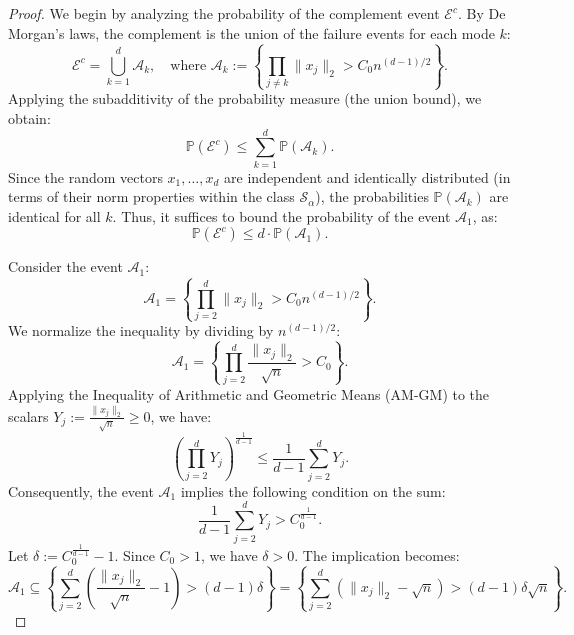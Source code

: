 \documentclass[10pt,a4paper]{amsart}
\begin{document}
\begin{proof}
We begin by analyzing the probability of the complement event $\mathcal{E}^c$. By De Morgan's laws, the complement is the union of the failure events for each mode $k$:
\begin{equation}
\mathcal{E}^c = \bigcup_{k=1}^d \mathcal{A}_k, \quad \text{where } \mathcal{A}_k := \left\{ \prod_{j \neq k} \|x_j\|_2 > C_0 n^{(d-1)/2} \right\}.
\end{equation}
Applying the subadditivity of the probability measure (the union bound), we obtain:
\begin{equation}
\mathbb{P}(\mathcal{E}^c) \le \sum_{k=1}^d \mathbb{P}(\mathcal{A}_k).
\end{equation}
Since the random vectors $x_1, \dots, x_d$ are independent and identically distributed (in terms of their norm properties within the class $\mathcal{S}_{\alpha}$), the probabilities $\mathbb{P}(\mathcal{A}_k)$ are identical for all $k$. Thus, it suffices to bound the probability of the event $\mathcal{A}_1$, as:
\begin{equation}
\mathbb{P}(\mathcal{E}^c) \le d \cdot \mathbb{P}(\mathcal{A}_1).
\end{equation}

Consider the event $\mathcal{A}_1$:
\begin{equation}
\mathcal{A}_1 = \left\{ \prod_{j=2}^d \|x_j\|_2 > C_0 n^{(d-1)/2} \right\}.
\end{equation}
We normalize the inequality by dividing by $n^{(d-1)/2}$:
\begin{equation}
\mathcal{A}_1 = \left\{ \prod_{j=2}^d \frac{\|x_j\|_2}{\sqrt{n}} > C_0 \right\}.
\end{equation}
Applying the Inequality of Arithmetic and Geometric Means (AM-GM) to the scalars $Y_j := \frac{\|x_j\|_2}{\sqrt{n}} \ge 0$, we have:
\begin{equation}
\left( \prod_{j=2}^d Y_j \right)^{\frac{1}{d-1}} \le \frac{1}{d-1} \sum_{j=2}^d Y_j.
\end{equation}
Consequently, the event $\mathcal{A}_1$ implies the following condition on the sum:
\begin{equation}
\frac{1}{d-1} \sum_{j=2}^d Y_j > C_0^{\frac{1}{d-1}}.
\end{equation}
Let $\delta := C_0^{\frac{1}{d-1}} - 1$. Since $C_0 > 1$, we have $\delta > 0$. The implication becomes:
\begin{equation}
\mathcal{A}_1 \subseteq \left\{ \sum_{j=2}^d \left( \frac{\|x_j\|_2}{\sqrt{n}} - 1 \right) > (d-1)\delta \right\} = \left\{ \sum_{j=2}^d (\|x_j\|_2 - \sqrt{n}) > (d-1)\delta \sqrt{n} \right\}.
\end{equation}


\end{proof}
\end{document}
